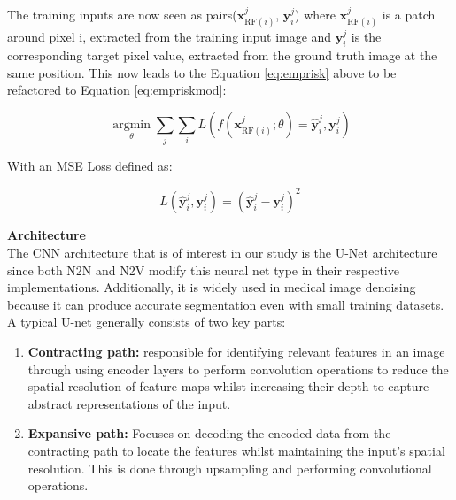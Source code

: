 The training inputs are now seen as pairs(${\mathbf{x}}_{{\text{RF}}(i)}^j$, ${\mathbf{y}}_i^j$) where ${\mathbf{x}}_{{\text{RF}}(i)}^j$ is a patch around pixel i, extracted from the training input image and ${\mathbf{y}}_i^j$ is the corresponding target pixel value, extracted from the ground truth image at the same position. This now leads to the Equation \ref{eq:emprisk} above to be refactored to Equation \ref{eq:empriskmod}:

\begin{equation}
	\mathop {\arg \min }\limits_\theta \sum\limits_j \sum\limits_i L\left( f({\mathbf{x}}_{{\text{RF}}(i)}^j;\theta ) = {\mathbf{\hat y}}_i^j, {\mathbf{y}}_i^j \right)
	\label{eq:empriskmod}
\end{equation}


With an \gls{MSE} Loss defined as:

\begin{equation}
	L\left( {\mathbf{\hat y}}_i^j, {\mathbf{y}}_i^j \right) = \left( {\mathbf{\hat y}}_i^j - {\mathbf{y}}_i^j \right)^2
	\label{eq:loss}
\end{equation}

\textbf{Architecture}\\
The \gls{CNN} architecture that is of interest in our study is the \gls{U-Net} architecture since both \gls{N2N} and \gls{N2V} modify this neural net type in their respective implementations. Additionally, it is widely used in medical image denoising because it can produce accurate segmentation even with small training datasets.  A typical U-net generally consists of two key parts:

\begin{enumerate}
	\item \textbf{Contracting path:} responsible for identifying relevant features in an image through using encoder layers to perform convolution operations to reduce the spatial resolution of feature maps whilst increasing their depth to capture abstract representations of the input. 
	\item \textbf{Expansive path:} Focuses on decoding the encoded data from the contracting path to locate the features whilst maintaining the input's spatial resolution. This is done through upsampling and performing convolutional operations.
\end{enumerate}

